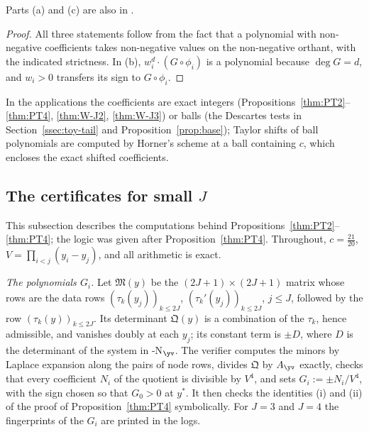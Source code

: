 Parts (a) and (c) are also in \cite{PaperI}.

\begin{proof}
All three statements follow from the fact that a polynomial with non-negative coefficients takes non-negative values
on the non-negative orthant, with the indicated strictness. In (b), $w_i^d\cdot(G\circ\phi_i)$ is a polynomial because
$\deg G=d$, and $w_i>0$ transfers its sign to $G\circ\phi_i$.
\end{proof}

In the applications the coefficients are exact integers (Propositions~\ref{thm:PT2}--\ref{thm:PT4}, \ref{thm:W-J2},
\ref{thm:W-J3}) or balls (the Descartes tests in Section~\ref{ssec:toy-tail} and Proposition~\ref{prop:base}); Taylor shifts of
ball polynomials are computed by Horner's scheme at a ball containing $c$, which encloses the exact shifted coefficients.

\subsection{The certificates for small \texorpdfstring{$J$}{J}}\label{app:proofs-PT}

This subsection describes the computations behind Propositions~\ref{thm:PT2}--\ref{thm:PT4}; the logic was given after
Proposition~\ref{thm:PT4}. Throughout, $c=\frac{21}{20}$, $V=\prod_{i<j}(y_i-y_j)$, and all arithmetic is exact.

\emph{The polynomials $G_i$.} Let $\mathfrak M(y)$ be the $(2J+1)\times(2J+1)$ matrix whose rows are the data rows
$(\tau_k(y_j))_{k\le2J}$, $(\tau_k'(y_j))_{k\le2J}$, $j\le J$, followed by the row $(\tau_k(y))_{k\le2J}$. Its determinant
$\mathfrak Q(y)$ is a combination of the $\tau_k$, hence admissible, and vanishes doubly at each $y_j$; its constant
term is $\pm D$, where $D$ is the determinant of the system in \hyp{N}$_{\yv}$. The verifier computes the minors by
Laplace expansion along the pairs of node rows, divides $\mathfrak Q$ by $A_{\yv}$ exactly, checks that every coefficient
$N_i$ of the quotient is divisible by $V^4$, and sets $G_i:=\pm N_i/V^4$, with the sign chosen so that $G_0>0$ at
$y^*$. It then checks the identities (i) and (ii) of the proof of Proposition~\ref{thm:PT4} symbolically. For $J=3$ and
$J=4$ the fingerprints of the $G_i$ are printed in the logs.

